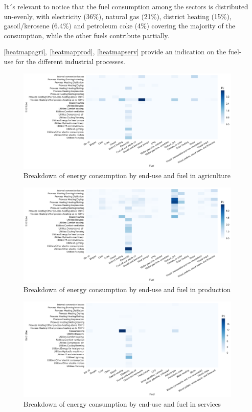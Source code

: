\documentclass[review]{elsarticle}
\begin{document}
It´s relevant to notice that the fuel consumption among the sectors is distributed un-evenly, with electricity (36\%), natural gas (21\%), district heating (15\%), gasoil/kerosene (6.4\%) and petroleum coke (4\%) covering the majority of the consumption, while the other fuels contribute partially.

\autoref{heatmapagri}, \autoref{heatmapprod}, \autoref{heatmapserv} provide an indication on the fuel-use for the different industrial processes. 

\begin{figure}[H]
\centering
\includegraphics[width=\linewidth]{Img/dan_ind/heatmap_agri.png}
\caption{Breakdown of energy consumption by end-use and fuel in agriculture\cite{VM2015}}
\label{heatmapagri} 
\end{figure}

\begin{figure}[H]
\centering
\includegraphics[width=\linewidth]{Img/dan_ind/heatmap_prod.png}
\caption{Breakdown of energy consumption by end-use and fuel in production\cite{VM2015}}
\label{heatmapprod} 
\end{figure}

\begin{figure}[H]
\centering
\includegraphics[width=\linewidth]{Img/dan_ind/heatmap_serv.png}
\caption{Breakdown of energy consumption by end-use and fuel in services\cite{VM2015}}
\label{heatmapserv} 
\end{figure}
\end{document}
